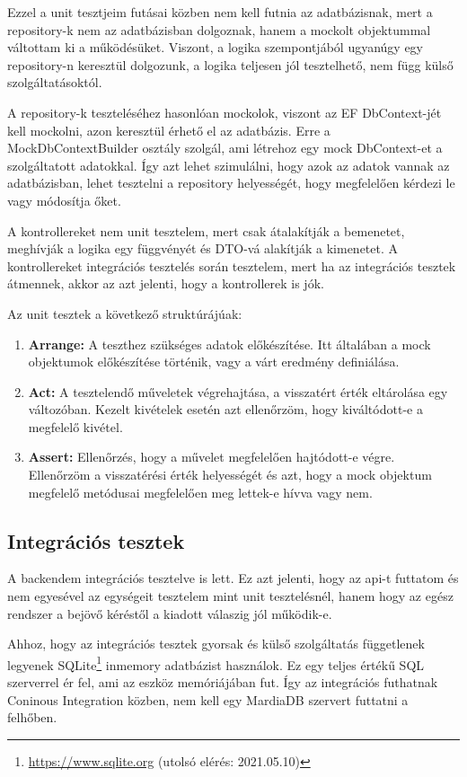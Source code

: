 Ezzel a unit tesztjeim futásai közben nem kell futnia az adatbázisnak, mert a repository-k nem az adatbázisban dolgoznak, hanem a mockolt objektummal váltottam ki a működésüket. Viszont, a logika szempontjából ugyanúgy egy repository-n keresztül dolgozunk, a logika teljesen jól tesztelhető, nem függ külső szolgáltatásoktól.

A repository-k teszteléséhez hasonlóan mockolok, viszont az EF DbContext-jét kell mockolni, azon keresztül érhető el az adatbázis. Erre a MockDbContextBuilder osztály szolgál, ami létrehoz egy mock DbContext-et a szolgáltatott adatokkal. Így azt lehet szimulálni, hogy azok az adatok vannak az adatbázisban, lehet tesztelni a repository helyességét, hogy megfelelően kérdezi le vagy módosítja őket.

A kontrollereket nem unit tesztelem, mert csak átalakítják a bemenetet, meghívják a logika egy függvényét és DTO-vá alakítják a kimenetet. A kontrollereket integrációs tesztelés során tesztelem, mert ha az integrációs tesztek átmennek, akkor az azt jelenti, hogy a kontrollerek is jók.

Az unit tesztek a következő struktúrájúak:
\begin{enumerate}
	\item \textbf{Arrange:} A teszthez szükséges adatok előkészítése. Itt általában a mock objektumok előkészítése történik, vagy a várt eredmény definiálása.
	\item \textbf{Act:} A tesztelendő műveletek végrehajtása, a visszatért érték eltárolása egy változóban. Kezelt kivételek esetén azt ellenőrzöm, hogy kiváltódott-e a megfelelő kivétel.
	\item \textbf{Assert:} Ellenőrzés, hogy a művelet megfelelően hajtódott-e végre. Ellenőrzöm a visszatérési érték helyességét és azt, hogy a mock objektum megfelelő metódusai megfelelően meg lettek-e hívva vagy nem.
\end{enumerate}

\subsection{Integrációs tesztek}
\label{sec:integrationTests}
A backendem integrációs tesztelve is lett. Ez azt jelenti, hogy az api-t futtatom és nem egyesével az egységeit tesztelem mint unit tesztelésnél, hanem hogy az egész rendszer a bejövő kéréstől a kiadott válaszig jól működik-e.

Ahhoz, hogy az integrációs tesztek gyorsak és külső szolgáltatás függetlenek legyenek SQLite\footnote{\url{https://www.sqlite.org} (utolsó elérés: 2021.05.10)} inmemory adatbázist használok. Ez egy teljes értékű SQL szerverrel ér fel, ami az eszköz memóriájában fut. Így az integrációs futhatnak Coninous Integration közben, nem kell egy MardiaDB szervert futtatni a felhőben.

